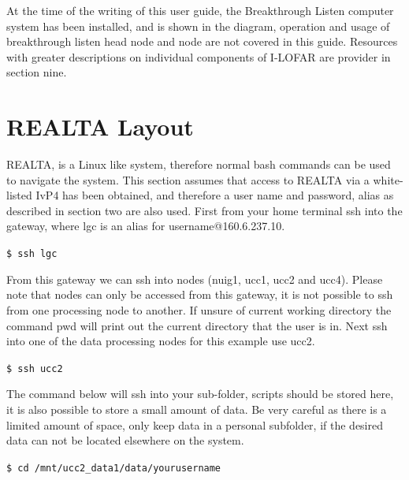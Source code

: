 \documentclass[11pt,fleqn]{book} %
\begin{document}
At the time of the writing of this user guide, the Breakthrough Listen computer system has been installed, and is shown in the diagram, operation and usage of breakthrough listen head node and node are not covered in this guide. Resources with greater descriptions on individual components of I-LOFAR are provider in section nine.

\section{REALTA Layout}
%
REALTA, is a Linux like system, therefore normal bash commands can be used to navigate the system. This section assumes that access to REALTA via a white-listed IvP4 has been obtained, and therefore a user name and password, alias as described in section two are also used. First from your home terminal ssh into the gateway, where lgc is an alias for username@160.6.237.10.

\vspace{3mm}

\verb|$ ssh lgc|

\vspace{3mm}

From this gateway we can ssh into nodes (nuig1, ucc1, ucc2 and ucc4). Please note that  nodes can only be accessed from this gateway, it is not possible to ssh from one processing node to another. If unsure of current working directory the command pwd will print out the current directory that the user is in. Next ssh into one of the data processing nodes for this example use ucc2.

\vspace{3mm}

\verb|$ ssh ucc2|

\vspace{3mm}

The command below will ssh into your sub-folder, scripts should be stored here, it is also possible to store a small amount of data. Be very careful as there is a limited amount of space, only keep data in a personal subfolder, if the desired data can not be located elsewhere on the system.

\vspace{3mm}

\verb|$ cd /mnt/ucc2_data1/data/yourusername|

\vspace{3mm}
\end{document}
